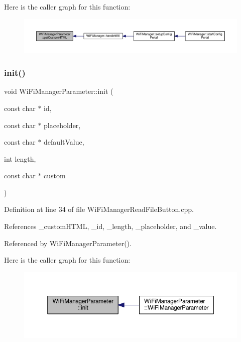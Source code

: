 Here is the caller graph for this function\+:
\nopagebreak
\begin{figure}[H]
\begin{center}
\leavevmode
\includegraphics[width=350pt]{d7/d08/class_wi_fi_manager_parameter_a596273c189eb40107500cee3ad31b13b_icgraph}
\end{center}
\end{figure}
\mbox{\label{class_wi_fi_manager_parameter_a137b764027d3851a428f3ab185a5660f}} 
\subsubsection{\texorpdfstring{init()}{init()}}
{\footnotesize\ttfamily void Wi\+Fi\+Manager\+Parameter\+::init (\begin{DoxyParamCaption}\item[{const char $\ast$}]{id,  }\item[{const char $\ast$}]{placeholder,  }\item[{const char $\ast$}]{default\+Value,  }\item[{int}]{length,  }\item[{const char $\ast$}]{custom }\end{DoxyParamCaption})\hspace{0.3cm}{\ttfamily [private]}}



Definition at line 34 of file Wi\+Fi\+Manager\+Read\+File\+Button.\+cpp.



References \+\_\+custom\+H\+T\+ML, \+\_\+id, \+\_\+length, \+\_\+placeholder, and \+\_\+value.



Referenced by Wi\+Fi\+Manager\+Parameter().

Here is the caller graph for this function\+:\nopagebreak
\begin{figure}[H]
\begin{center}
\leavevmode
\includegraphics[width=350pt]{d7/d08/class_wi_fi_manager_parameter_a137b764027d3851a428f3ab185a5660f_icgraph}
\end{center}
\end{figure}


